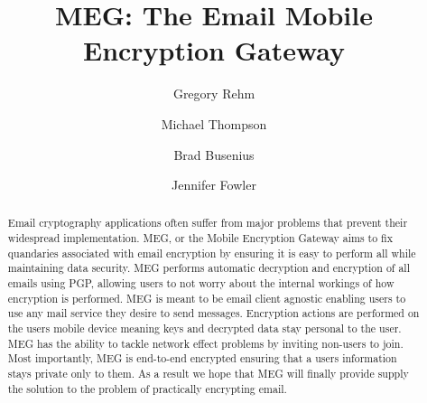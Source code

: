 \documentclass[10pt]{article}
\begin{document}
\title{MEG: The Email Mobile Encryption Gateway}

\author{Gregory Rehm} \author{Michael Thompson} \author{Brad Busenius} \author{Jennifer Fowler}


\maketitle

\begin{abstract}
\par Email cryptography applications often suffer from major problems that prevent their widespread implementation. MEG, or the Mobile Encryption Gateway aims to fix quandaries associated with email encryption by ensuring it is easy to perform all while maintaining data security. MEG performs automatic decryption and encryption of all emails using PGP, allowing users to not worry about the internal workings of how encryption is performed. MEG is meant to be email client agnostic enabling users to use any mail service they desire to send messages. Encryption actions are performed on the users mobile device meaning keys and decrypted data stay personal to the user. MEG has the ability to tackle network effect problems by inviting non-users to join. Most importantly, MEG is end-to-end encrypted ensuring that a users information stays private only to them. As a result we hope that MEG will finally provide supply the solution to the problem of practically encrypting email.
\end{abstract}
\end{document}
